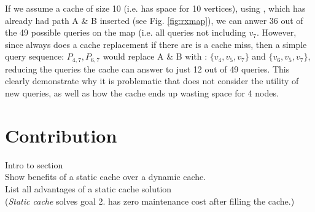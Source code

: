 If we assume a cache of size 10 (i.e. has space for 10 vertices), using \lruns, which has already had path A \& B inserted (see Fig. \ref{fig:rxmap}), we can anwer 36 out of the 49 possible queries on the map (i.e. all queries not including $v_7$. However, since \lru always does a cache replacement if there are is a cache miss, then a simple query sequence: $P_{4,7},P_{6,7}$ would replace A \& B with \spathns: $\{v_4,v_5,v_7\}$ and $\{v_6,v_5,v_7\}$, reducing the queries the cache can answer to just 12 out of 49 queries. This clearly demonstrate why it is problematic that \lru does not consider the utility of new queries, as well as how the cache ends up wasting space for 4 nodes.













\section{Contribution} \label{sec:contribution}

Intro to section \\
Show benefits of a static cache over a dynamic cache.\\
List all advantages of a static cache solution \\
(\textit{Static cache} solves goal 2. has zero maintenance cost after filling the cache.)

